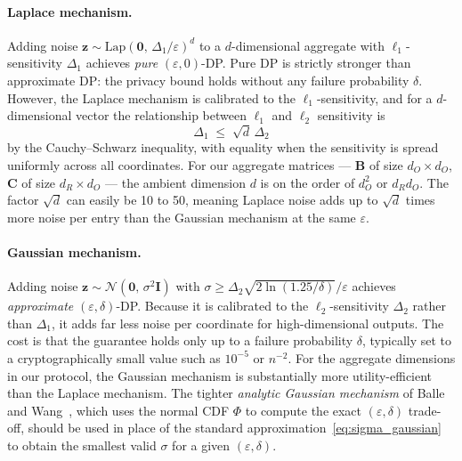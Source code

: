 \documentclass[12pt]{article}
\theoremstyle{definition}
\theoremstyle{plain}
\newcommand{\bB}{\mathbf{B}}
\newcommand{\bC}{\mathbf{C}}
\begin{document}
\paragraph{Laplace mechanism.}
Adding noise $\mathbf{z} \sim \mathrm{Lap}(\mathbf{0},\, \Delta_{1}/\varepsilon)^{d}$ to a
$d$-dimensional aggregate with $\ell_{1}$-sensitivity $\Delta_{1}$ achieves \emph{pure}
$(\varepsilon, 0)$-DP. Pure DP is strictly stronger than approximate DP: the privacy bound holds
without any failure probability $\delta$. However, the Laplace mechanism is calibrated to the
$\ell_{1}$-sensitivity, and for a $d$-dimensional vector the relationship between $\ell_{1}$ and
$\ell_{2}$ sensitivity is
\begin{equation}
  \Delta_{1} \;\leq\; \sqrt{d}\,\Delta_{2}
  \label{eq:l1l2}
\end{equation}
by the Cauchy--Schwarz inequality, with equality when the sensitivity is spread uniformly across all
coordinates. For our aggregate matrices --- $\bB$ of size $d_{O} \times d_{O}$, $\bC$ of size
$d_{R} \times d_{O}$ --- the ambient dimension $d$ is on the order of $d_{O}^{2}$ or $d_{R} d_{O}$.
The factor $\sqrt{d}$ can easily be 10 to 50, meaning Laplace noise adds up to $\sqrt{d}$ times more
noise per entry than the Gaussian mechanism at the same $\varepsilon$.

\paragraph{Gaussian mechanism.}
Adding noise $\mathbf{z} \sim \mathcal{N}(\mathbf{0},\, \sigma^{2}\mathbf{I})$ with
$\sigma \geq \Delta_{2}\sqrt{2\ln(1.25/\delta)}/\varepsilon$\label{eq:sigma_gaussian} achieves \emph{approximate}
$(\varepsilon, \delta)$-DP. Because it is calibrated to the $\ell_{2}$-sensitivity $\Delta_{2}$
rather than $\Delta_{1}$, it adds far less noise per coordinate for high-dimensional outputs. The
cost is that the guarantee holds only up to a failure probability $\delta$, typically set to a
cryptographically small value such as $10^{-5}$ or $n^{-2}$. For the aggregate dimensions in our
protocol, the Gaussian mechanism is substantially more utility-efficient than the Laplace mechanism.
The tighter \emph{analytic Gaussian mechanism} of Balle and Wang~\cite{balle2018improving}, which
uses the normal CDF $\Phi$ to compute the exact $(\varepsilon,\delta)$ trade-off, should be used
in place of the standard approximation~\eqref{eq:sigma_gaussian} to obtain the smallest valid
$\sigma$ for a given $(\varepsilon,\delta)$.
\end{document}

